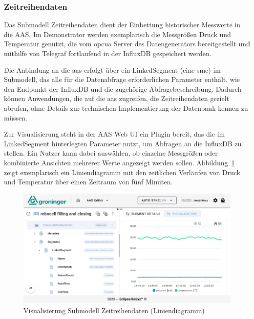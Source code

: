 \subsubsection*{Zeitreihendaten}
\vspace{-0.5em}

Das Submodell Zeitreihendaten dient der Einbettung historischer Messwerte in die AAS.
Im Demonstrator werden exemplarisch die Messgrößen Druck und Temperatur genutzt, die vom \acs{opcua} Server des Datengenerators bereitgestellt und mithilfe von Telegraf fortlaufend in der InfluxDB gespeichert werden.

Die Anbindung an die \acs{aas} erfolgt über ein LinkedSegment (eine \acs{smc}) im Submodell, das alle für die Datenabfrage erforderlichen Parameter enthält, wie den Endpunkt der InfluxDB und die zugehörige Abfragebeschreibung. 
Dadurch können Anwendungen, die auf die \acs{aas} zugreifen, die Zeitreihendaten gezielt abrufen, ohne Details zur technischen Implementierung der Datenbank kennen zu müssen.

Zur Visualisierung steht in der AAS Web UI ein Plugin bereit, das die im LinkedSegment hinterlegten Parameter nutzt, um Abfragen an die InfluxDB zu stellen.
Ein Nutzer kann dabei auswählen, ob einzelne Messgrößen oder kombinierte Ansichten mehrerer Werte angezeigt werden sollen. 
Abbildung~\ref{fig:LiniendiagrammBaSyx} zeigt exemplarisch ein Liniendiagramm mit den zeitlichen Verläufen von Druck und Temperatur über einen Zeitraum von fünf Minuten.

\begin{figure}[htbp]
    \centering
        \includegraphics[width=1\textwidth]{Bilder/ErgebnisseAASWebUI/Zeitreihen.png}
    \caption{Visualisierung Submodell Zeitreihendaten (Liniendiagramm)}
    \label{fig:LiniendiagrammBaSyx}
\end{figure}
\vspace{-0.5em}

